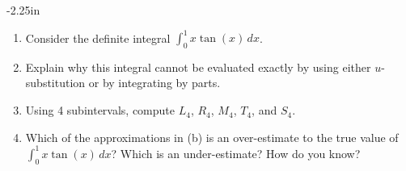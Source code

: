 \begin{adjustwidth*}{}{-2.25in}
\begin{multicols*}{2}
\begin{enumerate}[1),resume]
  \item Consider the definite integral $\int_0^1 x \tan(x) \, dx$.
  \ba
  	\item Explain why this integral cannot be evaluated exactly by using either $u$-substitution or by integrating by parts.
	\item Using 4 subintervals, compute $L_4$, $R_4$, $M_4$, $T_4$, and $S_4$.  
	\item Which of the approximations in (b) is an over-estimate to the true value of $\int_0^1 x \tan(x) \, dx$?  Which is an under-estimate?  How do you know?
  \ea
\end{enumerate}

\end{multicols*}
\end{adjustwidth*}

\clearpage

